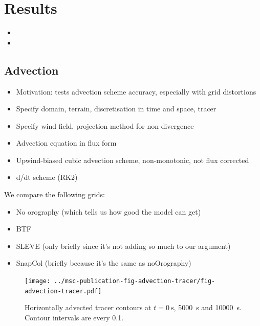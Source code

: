 \documentclass[twocol]{ametsoc}
\begin{document}
\section{Results}
\begin{itemize}
	\item {}
	\item {}
\end{itemize}

\subsection{Advection}
\begin{itemize}
	\item Motivation: tests advection scheme accuracy, especially with grid distortions
	\item Specify domain, terrain, discretisation in time and space, tracer
	\item Specify wind field, projection method for non-divergence
	\item Advection equation in flux form
	\item Upwind-biased cubic advection scheme, non-monotonic, not flux corrected
	\item d/dt scheme (RK2)
\end{itemize}

We compare the following grids:
\begin{itemize}
	\item No orography (which tells us how good the model can get)
	\item BTF
	\item SLEVE (only briefly since it's not adding so much to our argument)
	\item SnapCol (briefly because it's the same as noOrography)
\end{itemize}


\begin{figure}
	\centering
	\texttt{[image: ../msc-publication-fig-advection-tracer/fig-advection-tracer.pdf]}
%
	\caption{Horizontally advected tracer contours at $t = \SI{0}{\second}$, \SI{5000}{\second} and \SI{10000}{\second}.    Contour intervals are every 0.1.}
	\label{fig:advection-tracer}
\end{figure}
\end{document}
